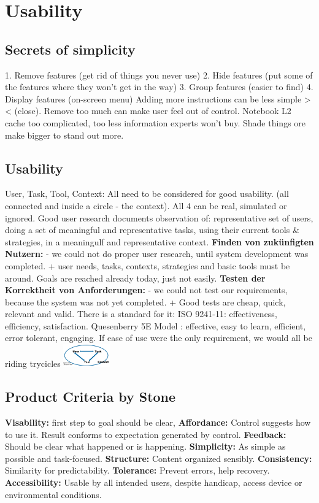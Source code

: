 \section{Usability}

\subsection{Secrets of simplicity}
1. Remove features (get rid of things you never use)
2. Hide features (put  some of the features where they won't get in the way)
3. Group features (easier to find)
4. Display features (on-screen menu)
Adding more instructions can be less simple >< (close).
Remove too much can make user feel out of control.
Notebook L2 cache too complicated, too less information experts won't buy.
Shade things ore make bigger to stand out more.

\subsection{Usability}
User, Task, Tool, Context: All need to be considered for good usability. (all connected and inside a circle - the context). All 4 can be real, simulated or ignored.
Good user research documents observation of: representative set of users, doing a set of meaningful and representative tasks, using their current tools \& strategies, in a meaningulf and representative context. \textbf{Finden von zukünfigten Nutzern:} - we could not do proper user research, until system development was completed. + user needs, tasks, contexts, strategies and basic tools must be around. Goals are reached already today, just not easily. \textbf{Testen der Korrektheit von Anforderungen:} - we could not test our requirements, because the system was not yet completed. +  Good tests are cheap, quick, relevant and valid.
There is a standard for it: ISO 9241-11: effectiveness, efficiency, satisfaction. 
Quesenberry 5E Model : effective, easy to learn, efficient, error tolerant, engaging.
If ease of use were the only requirement, we would all be riding trycicles
\includegraphics[width=0.15\textwidth]{userToolTask.png}

\subsection{Product Criteria by Stone}
\textbf{Visability:} first step to goal should be clear, \textbf{Affordance:} Control suggests how to use it. Result conforms to expectation generated by control. \textbf{Feedback:} Should be clear what happened or is happening. \textbf{Simplicity:} As simple as possible and task-focused. \textbf{Structure:} Content organized sensibly. \textbf{Consistency:} Similarity for predictability. \textbf{Tolerance:} Prevent errors, help recovery. \textbf{Accessibility:} Usable by all intended users, despite handicap, access device or environmental conditions.

